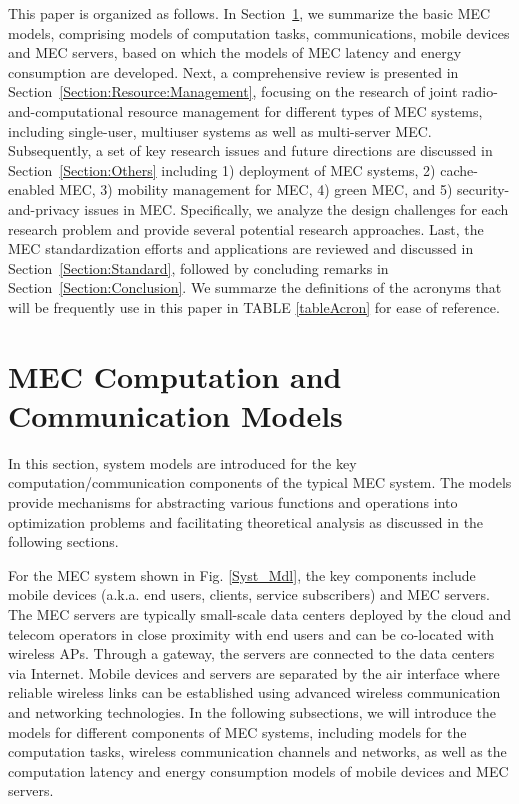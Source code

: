 \documentclass[journal]{IEEEtran}
\begin{document}
This paper is organized as follows. In Section~\ref{Section:System:Model}, we summarize the basic  MEC models, comprising models of computation tasks, communications, mobile devices   and MEC servers, based on which the models of MEC latency and energy consumption are developed. Next, a comprehensive review is presented in Section~\ref{Section:Resource:Management}, focusing on the research of joint radio-and-computational resource management for different types of MEC systems, including single-user, multiuser systems as well as multi-server MEC. Subsequently, a set of key research issues and future directions are discussed in Section~\ref{Section:Others} including 1) deployment of MEC systems, 2) cache-enabled MEC, 3) mobility management for MEC, 4) green MEC, and 5) security-and-privacy issues in MEC. Specifically, we analyze the design challenges for each research problem and provide several potential research approaches. Last, the MEC standardization efforts and applications are reviewed and discussed in Section~\ref{Section:Standard}, followed by concluding remarks in Section~\ref{Section:Conclusion}. {\color{black}We summarze the definitions of the acronyms that will be frequently use in this paper in TABLE \ref{tableAcron} for ease of reference.}




\section{MEC Computation and Communication Models} \label{Section:System:Model}
In this section, system models are introduced for the key computation/communication components of  the typical MEC system. The models provide mechanisms for abstracting various functions and operations into optimization problems and facilitating theoretical analysis as discussed in the following sections.


For the  MEC system shown in Fig. \ref{Syst_Mdl}, the key components include  mobile devices (a.k.a. end users, clients, service subscribers) and MEC servers. The MEC servers are typically small-scale data centers  deployed by the cloud and telecom operators in close proximity with end users and can be  co-located with  wireless APs. Through a gateway, the servers are connected to the  data centers via Internet. Mobile devices and servers are separated by the air interface where reliable wireless links can be established using  advanced wireless communication and networking technologies. In the following subsections, we will introduce the models for  different components of MEC systems, including models for the computation tasks, wireless communication channels and networks, as well as the computation latency and energy consumption models of mobile devices and MEC servers.
\end{document}
